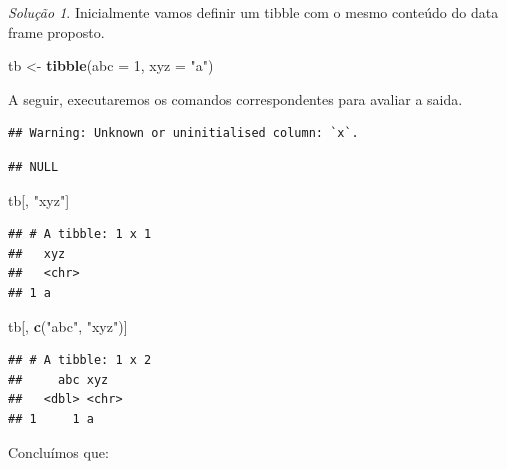 \documentclass[
]{latex/krantz}
\newenvironment{Shaded}{\begin{snugshade}}{\end{snugshade}}
\newcommand{\AttributeTok}[1]{\textcolor[rgb]{0.13,0.29,0.53}{#1}}
\newcommand{\DecValTok}[1]{\textcolor[rgb]{0.00,0.00,0.81}{#1}}
\newcommand{\FunctionTok}[1]{\textcolor[rgb]{0.13,0.29,0.53}{\textbf{#1}}}
\newcommand{\NormalTok}[1]{#1}
\newcommand{\OtherTok}[1]{\textcolor[rgb]{0.56,0.35,0.01}{#1}}
\newcommand{\SpecialCharTok}[1]{\textcolor[rgb]{0.81,0.36,0.00}{\textbf{#1}}}
\newcommand{\StringTok}[1]{\textcolor[rgb]{0.31,0.60,0.02}{#1}}
\theoremstyle{definition}
\theoremstyle{definition}
\theoremstyle{definition}
\theoremstyle{definition}
\theoremstyle{remark}
\newtheorem*{solution}{Solução}
\begin{document}
\begin{solution}

Inicialmente vamos definir um tibble com o mesmo conteúdo do data frame proposto.

\begin{Shaded}
\begin{Highlighting}[]
\NormalTok{tb }\OtherTok{\textless{}{-}} \FunctionTok{tibble}\NormalTok{(}\AttributeTok{abc =} \DecValTok{1}\NormalTok{, }\AttributeTok{xyz =} \StringTok{"a"}\NormalTok{)}
\end{Highlighting}
\end{Shaded}

A seguir, executaremos os comandos correspondentes para avaliar a saida.

\begin{Shaded}
\end{Shaded}

\begin{verbatim}
## Warning: Unknown or uninitialised column: `x`.
\end{verbatim}

\begin{verbatim}
## NULL
\end{verbatim}

\begin{Shaded}
\begin{Highlighting}[]
\NormalTok{tb[, }\StringTok{"xyz"}\NormalTok{]}
\end{Highlighting}
\end{Shaded}

\begin{verbatim}
## # A tibble: 1 x 1
##   xyz  
##   <chr>
## 1 a
\end{verbatim}

\begin{Shaded}
\begin{Highlighting}[]
\NormalTok{tb[, }\FunctionTok{c}\NormalTok{(}\StringTok{"abc"}\NormalTok{, }\StringTok{"xyz"}\NormalTok{)]}
\end{Highlighting}
\end{Shaded}

\begin{verbatim}
## # A tibble: 1 x 2
##     abc xyz  
##   <dbl> <chr>
## 1     1 a
\end{verbatim}

Concluímos que:


\end{solution}
\end{document}
